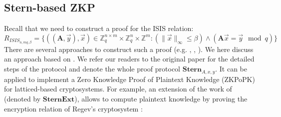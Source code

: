 
\subsection{Stern-based ZKP}
\label{sec:Stern-basedZKP}
Recall that we need to construct a proof for the ISIS relation:
\[
  R_{ISIS_{n,mq,\beta}} = \{ ((\mathbf{A},\vec{y}),\vec{x})
  \in \mathbb{Z}_q^{n\times m} \times \mathbb{Z}_q^n
  \times \mathbb{Z}^m: (\|\vec{x}\|_\infty \leq \beta) \land
  (\mathbf{A}\vec{x} = \vec{y} \mod q) \}
\]
There are several approaches to construct such a proof (e.g. \cite{lyubashevsky2008lattice},
\cite{micciancio2003statistical}, \cite{stern1993new}). We here discuss an approach based on \cite{stern1993new}. We refer our readers to the original paper for the detailed steps of the protocol and denote the whole proof protocol
\(\mathbf{Stern}_{A,x,y}\). It can be applied to implement a Zero Knowledge Proof of
Plaintext Knowledge (ZKPoPK) for latticed-based cryptosystems. For example, an extension of the work of \cite{ling2013improved}  (denoted by \(\mathbf{SternExt}\)), allows to compute plaintext knowledge by proving the encryption relation
of Regev's cryptosystem \cite{regev2009lattices}:

